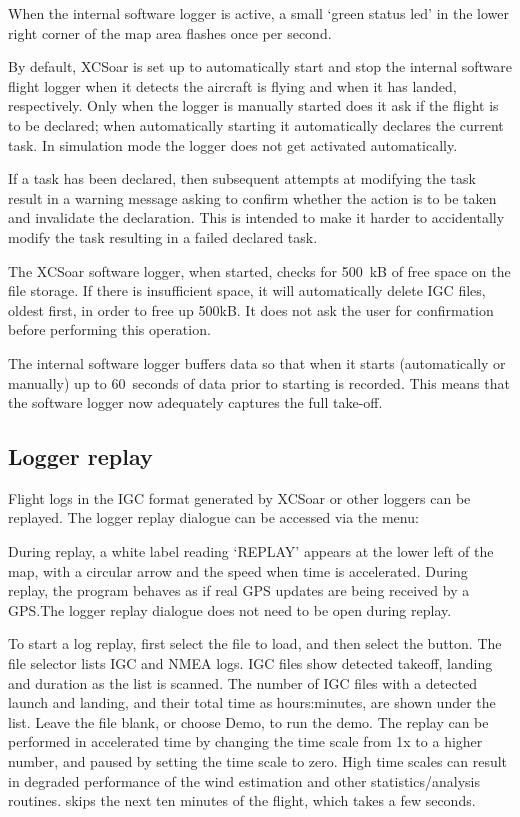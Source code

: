 When the internal software logger is active, a small `green status led' in the
lower right corner of the map area flashes once per second.

By default, XCSoar is set up to automatically start and stop the
internal software flight logger when it detects the aircraft is flying
and when it has landed, respectively.  Only when the logger is
manually started does it ask if the flight is to be declared; when
automatically starting it automatically declares the current task.
In simulation mode the logger does not get activated automatically.

If a task has been declared, then subsequent attempts at modifying the
task result in a warning message asking to confirm whether the action
is to be taken and invalidate the declaration.  This is intended to
make it harder to accidentally modify the task resulting in a failed
declared task.

The XCSoar software logger, when started, checks for 500~kB of free
space on the file storage.  If there is insufficient space, it will
automatically delete IGC files, oldest first, in order to free up
500kB.  It does not ask the user for confirmation before performing
this operation. \warning{}

The internal software logger buffers data so that when it starts
(automatically or manually) up to 60~seconds of data prior to starting
is recorded.  This means that the software logger now adequately
captures the full take-off.

\subsection*{Logger replay}\label{sec:logger-replay}
Flight logs in the IGC format generated by XCSoar or other loggers can
be replayed.  The logger replay dialogue can be accessed via the
menu:
\begin{quote}
\blink{}
\end{quote}

During replay, a white label reading `REPLAY' appears at the lower
left of the map, with a circular arrow and the speed when time is
accelerated.  During replay, the program behaves as if real GPS
updates are being received by a GPS.\@  The logger replay dialogue
does not need to be open during replay.

To start a log replay, first select the file to load, and then select the
 button.  The file selector lists IGC and NMEA logs.  IGC
files show detected takeoff, landing and duration as the list is scanned.
The number of IGC files with a detected launch and landing, and their
total time as hours:minutes, are shown under the list.
Leave the file blank, or choose Demo, to run the demo.  The replay can be
performed in accelerated time
by changing the time scale from 1x to a higher number, and paused by
setting the time scale to zero.  High time scales can result in degraded
performance of the wind estimation and other statistics/analysis routines.
 skips the next ten minutes of the flight, which takes
a few seconds.

